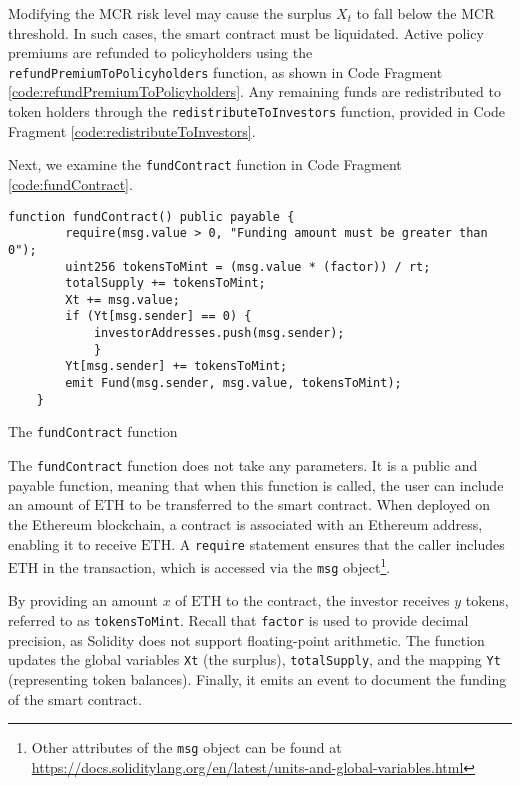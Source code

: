 \documentclass[10pt]{article}
\begin{document}
Modifying the MCR risk level may cause the surplus \(X_t\) to fall below the MCR threshold. In such cases, the smart contract must be liquidated. Active policy premiums are refunded to policyholders using the \texttt{refundPremiumToPolicyholders} function, as shown in Code Fragment \ref{code:refundPremiumToPolicyholders}. Any remaining funds are redistributed to token holders through the \texttt{redistributeToInvestors} function, provided in Code Fragment \ref{code:redistributeToInvestors}. 

Next, we examine the \texttt{fundContract} function in Code Fragment \ref{code:fundContract}.
 
\begin{codefragment}[!h]
\begin{lstlisting}[language=Solidity]
   function fundContract() public payable {
        require(msg.value > 0, "Funding amount must be greater than 0");
        uint256 tokensToMint = (msg.value * (factor)) / rt;
        totalSupply += tokensToMint;
        Xt += msg.value;
        if (Yt[msg.sender] == 0) {
            investorAddresses.push(msg.sender);
            }
        Yt[msg.sender] += tokensToMint;
        emit Fund(msg.sender, msg.value, tokensToMint);
    }
\end{lstlisting}
    \caption{The \texttt{fundContract} function}
    \label{code:fundContract}
\end{codefragment}
The \texttt{fundContract} function does not take any parameters. It is a public and payable function, meaning that when this function is called, the user can include an amount of \(\text{ETH}\) to be transferred to the smart contract. When deployed on the Ethereum blockchain, a contract is associated with an Ethereum address, enabling it to receive \(\text{ETH}\). A \texttt{require} statement ensures that the caller includes \(\text{ETH}\) in the transaction, which is accessed via the \texttt{msg} object\footnote{Other attributes of the \texttt{msg} object can be found at \url{https://docs.soliditylang.org/en/latest/units-and-global-variables.html}}.

By providing an amount \(x\) of \(\text{ETH}\) to the contract, the investor receives \(y\) tokens, referred to as \texttt{tokensToMint}. Recall that \texttt{factor} is used to provide decimal precision, as Solidity does not support floating-point arithmetic. The function updates the global variables \texttt{Xt} (the surplus), \texttt{totalSupply}, and the mapping \texttt{Yt} (representing token balances). Finally, it emits an event to document the funding of the smart contract. 
\end{document}

